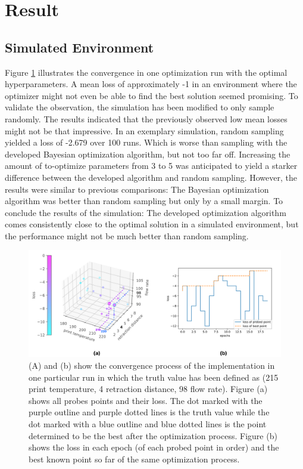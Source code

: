 \section{Result}

\subsection{Simulated Environment}

Figure \ref{figure/convergence} illustrates the convergence in one optimization run with the optimal hyperparameters. A mean loss of approximately -1 in an environment where the optimizer might not even be able to find the best solution seemed promising. To validate the observation, the simulation has been modified to only sample randomly. The results indicated that the previously observed low mean losses might not be that impressive. In an exemplary simulation, random sampling yielded a loss of -2.679 over 100 runs. Which is worse than sampling with the developed Bayesian optimization algorithm, but not too far off. Increasing the amount of to-optimize parameters from 3 to 5 was anticipated to yield a starker difference between the developed algorithm and random sampling. However, the results were similar to previous comparisons: The Bayesian optimization algorithm was better than random sampling but only by a small margin. To conclude the results of the simulation: The developed optimization algorithm comes consistently close to the optimal solution in a simulated environment, but the performance might not be much better than random sampling.

\begin{figure}[h]
    \centering
    \includegraphics[width=1\linewidth]{assets/convergence_both.png}
    \caption{(A) and (b) show the convergence process of the implementation in one particular run in which the truth value has been defined as (215 print temperature, 4 retraction distance, 98 flow rate). Figure (a) shows all probes points and their loss. The dot marked with the purple outline and purple dotted lines is the truth value while the dot marked with a blue outline and blue dotted lines is the point determined to be the best after the optimization process. Figure (b) shows the loss in each epoch (of each probed point in order) and the best known point so far of the same optimization process.}
    \label{figure/convergence}
\end{figure}

